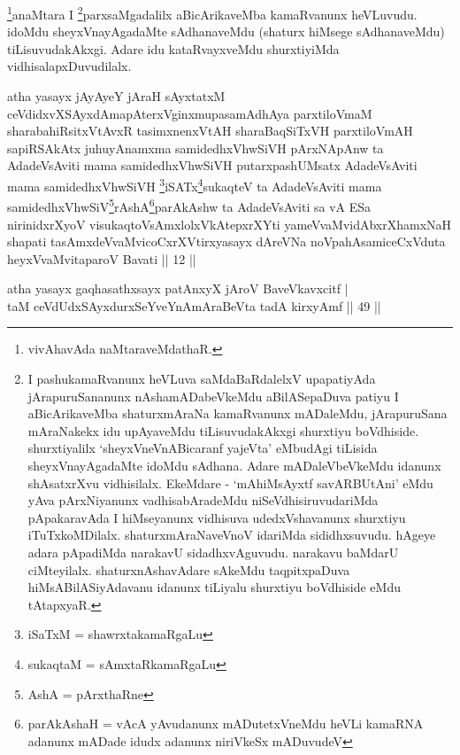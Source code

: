\begin{artha}
\footnote{vivAhavAda naMtaraveMdathaR.}anaMtara I \footnote{I 
pashukamaRvanunx heVLuva saMdaBaRdalelxV upapatiyAda jArapuruSananunx 
nAshamADabeVkeMdu aBilASepaDuva patiyu I aBicArikaveMba shaturxmAraNa 
kamaRvanunx mADaleMdu, jArapuruSana mAraNakekx idu upAyaveMdu 
tiLisuvudakAkxgi shurxtiyu boVdhiside. shurxtiyalilx 
`sheyxVneVnABicaranf yajeVta' eMbudAgi tiLisida sheyxVnayAgadaMte 
idoMdu sAdhana. Adare mADaleVbeVkeMdu idanunx shAsatxrXvu vidhisilalx. 
EkeMdare - `mAhiMsAyxtf savARBUtAni' eMdu yAva pArxNiyanunx 
vadhisabAradeMdu niSeVdhisiruvudariMda pApakaravAda I hiMseyanunx 
vidhisuva udedxVshavanunx shurxtiyu iTuTxkoMDilalx. 
shaturxmAraNaveVnoV idariMda sididhxsuvudu. hAgeye adara pApadiMda 
narakavU sidadhxvAguvudu. narakavu baMdarU ciMteyilalx. 
shaturxnAshavAdare sAkeMdu taqpitxpaDuva hiMsABilASiyAdavanu idanunx 
tiLiyalu shurxtiyu boVdhiside eMdu tAtapxyaR.}parxsaMgadalilx aBicArikaveMba 
kamaRvanunx heVLuvudu. idoMdu sheyxVnayAgadaMte sAdhanaveMdu (shaturx 
hiMsege sAdhanaveMdu) tiLisuvudakAkxgi. Adare idu kataRvayxveMdu 
shurxtiyiMda vidhisalapxDuvudilalx.
\end{artha}

\begin{kandikeshl}
atha yasayx jAyAyeY jAraH sAyxtatxM ceVdidxvXSAyxdAmapAterxV\s ginxmupasamAdhAya parxtiloVmaM sharabahiRsitxVtAvxR tasimxnenxVtAH sharaBaqSiTxVH parxtiloVmAH sapiRSAkAtx juhuyAnamxma samidedhxV\s hwSiVH pArxNApAnw ta AdadeV\s sAviti mama samidedhxV\s hwSiVH putarxpashUMsatx AdadeV\s sAviti mama samidedhxV\s hwSiVH \footnote{iSaTxM = shawrxtakamaRgaLu}iSATx\footnote{sukaqtaM = sAmxtaRkamaRgaLu}sukaqteV ta AdadeV\s sAviti mama samidedhxV\s hwSiV\footnote{AshA = pArxthaRne}rAshA\footnote{parAkAshaH = vAcA yAvudanunx mADutetxVneMdu heVLi kamaRNA adanunx mADade idudx adanunx niriVkeSx mADuvudeV}parAkAshw ta AdadeV\s sAviti sa vA ESa nirinidxrXyoV visukaqtoV\s sAmxlolxVkAtepxrXYti yameVvaMvidAbxrXhamxNaH shapati tasAmxdeVvaMvicoCxrXVtirxyasayx dAreVNa noVpahAsamiceCxVduta heyxVvaMvitaparoV Bavati || 12 ||
\end{kandikeshl}


\begin{shl}
atha yasayx gaqhasathxsayx patAnxyX jAroV BaveVkavxcitf | \\
taM ceVdUdxSAyxdurxSeYveYnAmAraBeVta tadA kirxyAmf \hfill|| 49 || 
\end{shl}

